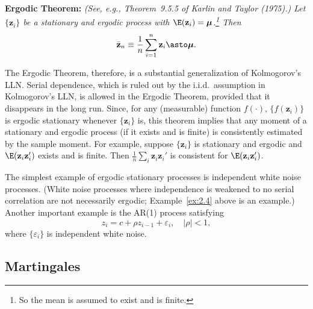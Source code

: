 \medskip
\noindent\textbf{Ergodic Theorem:}\quad
\emph{(See, e.g., Theorem~9.5.5 of Karlin and Taylor (1975).) Let
$\{\mathbf{z}_i\}$ be a stationary and ergodic process with
$\E(\mathbf{z}_i) = \bm{\mu}$.\footnote{So the mean is assumed to exist and is
finite.}  Then}
\[
  \bar{\mathbf{z}}_n \equiv \frac{1}{n} \sum_{i=1}^{n} \mathbf{z}_i
  \asto \bm{\mu}.
\]

The Ergodic Theorem, therefore, is a substantial generalization of Kolmogorov's
LLN.  Serial dependence, which is ruled out by the i.i.d.\ assumption in
Kolmogorov's LLN, is allowed in the Ergodic Theorem, provided that it disappears
in the long run.  Since, for any (measurable) function $f(\cdot)$,
$\{f(\mathbf{z}_i)\}$ is ergodic stationary whenever $\{\mathbf{z}_i\}$ is, this
theorem implies that any moment of a stationary and ergodic process (if it exists
and is finite) is consistently estimated by the sample moment.  For example,
suppose $\{\mathbf{z}_i\}$ is stationary and ergodic and
$\E(\mathbf{z}_i\mathbf{z}_i')$ exists and is finite.  Then
$\frac{1}{n}\sum_i \mathbf{z}_i\mathbf{z}_i'$ is consistent for
$\E(\mathbf{z}_i\mathbf{z}_i')$.

The simplest example of ergodic stationary processes is independent white noise
processes.  (White noise processes where independence is weakened to no serial
correlation are not necessarily ergodic; Example~\ref{ex:2.4} above is an example.)
Another important example is the AR(1) process satisfying
\[
  z_i = c + \rho z_{i-1} + \varepsilon_i, \quad |\rho| < 1,
\]
where $\{\varepsilon_i\}$ is independent white noise.

\subsection*{Martingales}

